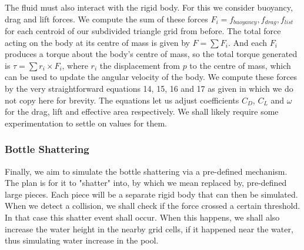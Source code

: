 The fluid must also interact with the rigid body.
For this we consider buoyancy, drag and lift forces.
We compute the sum of these forces $F_i = f_{buoyancy}, f_{drag}, f_{list}$ for each centroid of our subdivided triangle grid from before.
The total force acting on the body at its centre of mass is given by $F = \sum F_i$.
And each $F_i$ produces a torque about the body's centre of mass, so the total torque generated is $\tau = \sum r_i \times F_i$, where $r_i$ the displacement from $p$ to the centre of mass, which can be used to update the angular velocity of the body.
We compute these forces by the very straightforward equations 14, 15, 16 and 17 as given in \cite{hfluid} which we do not copy here for brevity.
The equations let us adjust coefficients $C_D$, $C_L$ and $\omega$ for the drag, lift and effective area respectively.
We shall likely require some experimentation to settle on values for them.
\subsubsection{Bottle Shattering}
Finally, we aim to simulate the bottle shattering via a pre-defined mechanism.
The plan is for it to "shatter" into, by which we mean replaced by, pre-defined large pieces.
Each piece will be a separate rigid body that can then be simulated.
When we detect a collision, we shall check if the force crossed a certain threshold.
In that case this shatter event shall occur.
When this happens, we shall also increase the water height in the nearby grid cells, if it happened near the water, thus simulating water increase in the pool.

